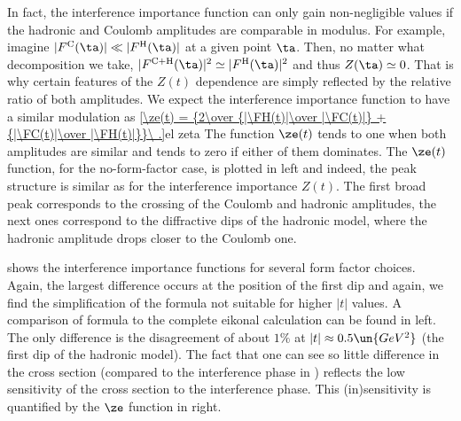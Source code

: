In fact, the interference importance function can only gain non-negligible values if the hadronic and Coulomb amplitudes are comparable in modulus. For example, imagine $|\FC(\ta)| \ll |\FH(\ta)|$ at a given point $\ta$. Then, no matter what decomposition  we take, $|\FCH(\ta)|^2 \simeq |\FH(\ta)|^2$ and thus $Z(\ta) \simeq 0$. That is why certain features of the $Z(t)$ dependence are simply reflected by the relative ratio of both amplitudes. We expect the interference importance function to have a similar modulation as 
\eqref{\ze(t) = {2\over {|\FH(t)|\over |\FC(t)|} + {|\FC(t)|\over |\FH(t)|}}\ .}{el zeta}
The function $\ze(t)$ tends to one when both amplitudes are similar and tends to zero if either of them dominates. The $\ze(t)$ function, for the no-form-factor case, is plotted in  left and indeed, the peak structure is similar as for the interference importance $Z(t)$. The first broad peak corresponds to the crossing of the Coulomb and hadronic amplitudes, the next ones correspond to the diffractive dips of the hadronic model, where the hadronic amplitude drops closer to the Coulomb one.

\vfil

 shows the interference importance functions for several form factor choices. Again, the largest difference occurs at the position of the first dip and again, we find the simplification of the \WaY{} formula not suitable for higher $|t|$ values. A comparison of \KL{} formula to the complete eikonal calculation can be found in  left. The only difference is the disagreement of about $1\%$ at $|t| \approx 0.5\un{GeV^2}$ (the first dip of the hadronic model). The fact that one can see so little difference in the cross section (compared to the interference phase in ) reflects the low sensitivity of the cross section to the interference phase. This (in)sensitivity is quantified by the $\ze$ function in  right.


\vfil




